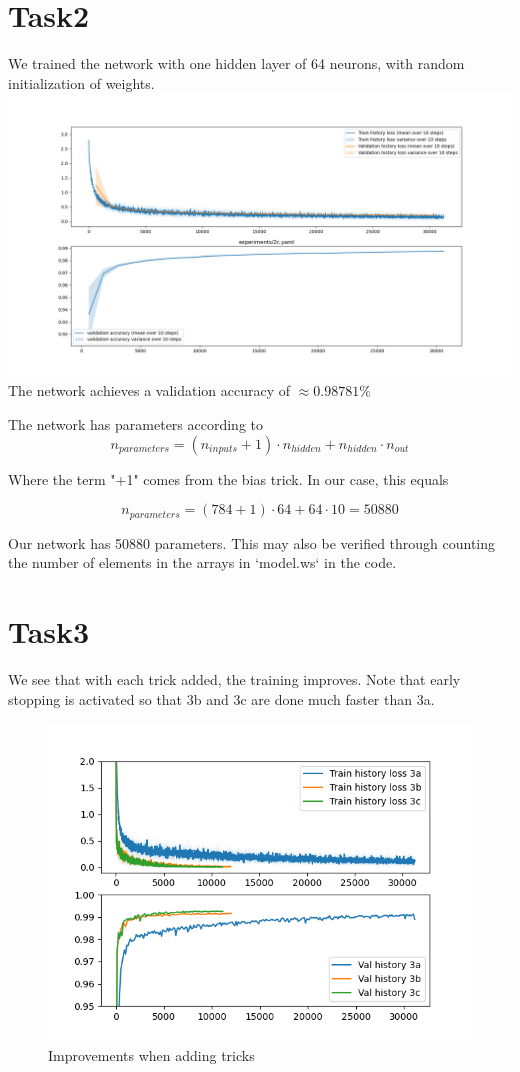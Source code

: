 \documentclass[a4paper]{article}
\begin{document}
\section*{Task2}
We trained the network with one hidden layer of 64 neurons, with random initialization of weights.
\includegraphics[width=\linewidth]{code/experiments/2c.png}
The network achieves a validation accuracy of $\approx 0.98781 \%$

The network has parameters according to
$$
n_{parameters} = (n_{inputs} + 1) \cdot n_{hidden} + n_{hidden} \cdot n_{out}
$$

Where the term "+1" comes from the bias trick. In our case, this equals

$$
n_{parameters} = (784 + 1) \cdot 64 + 64 \cdot 10 = 50880
$$

Our network has 50880 parameters. This may also be verified through counting the number of elements in the arrays in `model.ws` in the code.

\clearpage
\section*{Task3}
We see that with each trick added, the training improves. Note that early stopping is activated so that 3b and 3c are done much faster than 3a.

\begin{figure}[h]
    \includegraphics[width=\linewidth]{code/Adding tricks.png}
    \caption{Improvements when adding tricks}
\end{figure}
\end{document}
